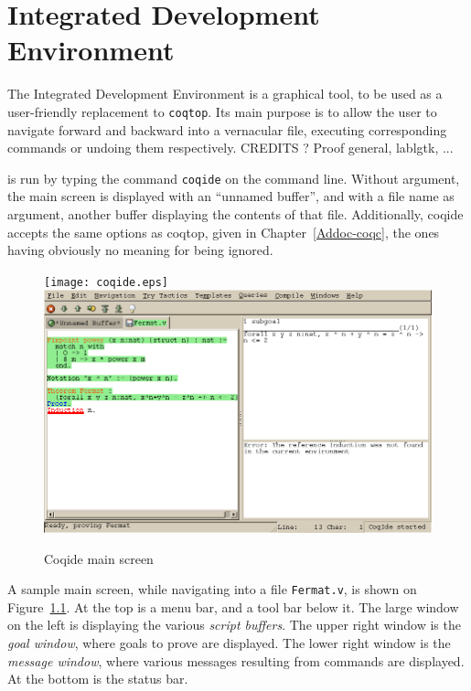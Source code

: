 \chapter{\Coq{} Integrated Development Environment}
\label{Addoc-coqide}

The \Coq{} Integrated Development Environment is a graphical tool, to
be used as a user-friendly replacement to \texttt{coqtop}. Its main
purpose is to allow the user to navigate forward and backward into a
\Coq{} vernacular file, executing corresponding commands or undoing
them respectively. CREDITS ? Proof general, lablgtk, ...

\coqide{} is run by typing the command \verb|coqide| on the command
line. Without argument, the main screen is displayed with an ``unnamed
buffer'', and with a file name as argument, another buffer displaying
the contents of that file. Additionally, coqide accepts the same
options as coqtop, given in Chapter~\ref{Addoc-coqc}, the ones having
obviously no meaning for \coqide{} being ignored.

\begin{figure}[t]
\begin{center}
\ifx\pdfoutput\undefined   %
\texttt{[image: coqide.eps]}
\else
\includegraphics[width=1.0\textwidth]{coqide.png}
\fi
\end{center}
\caption{Coqide main screen}
\label{fig:coqide}
\end{figure}

A sample \coqide{} main screen, while navigating into a file
\verb|Fermat.v|, is shown on Figure~\ref{fig:coqide}.  At
the top is a menu bar, and a tool bar below it. The large window on
the left is displaying the various \emph{script buffers}. The upper right
window is the \emph{goal window}, where goals to 
prove are displayed. The lower right window is the \emph{message window},
where various messages resulting from commands are displayed. At the
bottom is the status bar.

